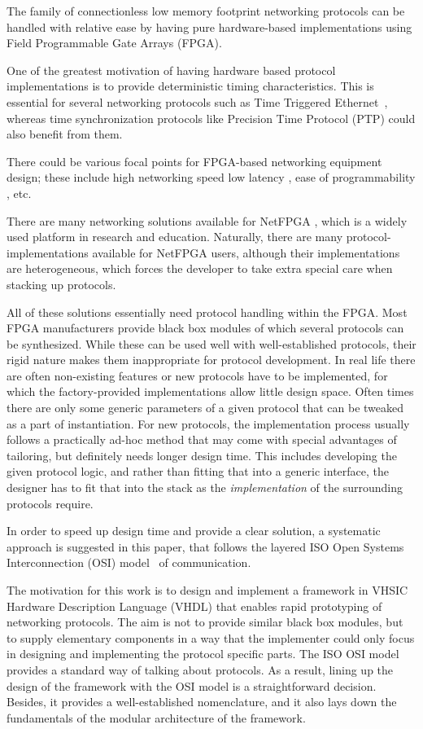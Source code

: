 \documentclass[journal]{IEEEtran}
\begin{document}
The family of connectionless low memory footprint networking protocols can be handled with relative ease by having pure
hardware-based implementations using Field Programmable Gate Arrays (FPGA).

One of the greatest motivation of having hardware based protocol implementations is to provide deterministic timing
characteristics. This is essential for several networking protocols such as Time Triggered Ethernet~\cite{SAE_AS6802},
whereas time synchronization protocols like  Precision Time Protocol (PTP) \cite{PTP_standard}could also benefit from
them.

There could be various focal points for FPGA-based networking equipment design; these include high networking speed
\cite{C-GEP_HPSR} low latency \cite{related:TrustNode}, ease of programmability \cite{C-Board_NEMA}, etc.

There are many networking solutions available for NetFPGA \cite{NetFPGA}, which is a widely used platform
in research and education. Naturally, there are many protocol-implementations available for NetFPGA users, although
their implementations are heterogeneous, which forces the developer to take extra special care when stacking up
protocols.

All of these solutions essentially need protocol handling within the FPGA. Most FPGA manufacturers provide black box
modules of which several protocols can be synthesized. While these can be used well with well-established protocols,
their rigid nature makes them inappropriate for protocol development.
In real life there are often non-existing features
or new protocols have to be implemented, for which the factory-provided implementations allow little design space.
Often times there are only some generic parameters of a given protocol that can be tweaked as a part of instantiation.
For new protocols, the implementation process usually follows a practically ad-hoc method that may come with special
advantages of tailoring, but definitely needs longer design time.
This includes developing the given protocol logic, and rather than fitting that into a generic interface,
the designer has to fit that into the stack as the \emph{implementation} of the surrounding protocols require.

In order to speed up design time and provide a clear solution, a systematic approach is suggested in this paper,
that follows the layered ISO Open Systems Interconnection (OSI) model~\cite{ISO:OSI} of communication.

The motivation for this work is to design and implement a framework in VHSIC Hardware Description Language (VHDL) that enables rapid prototyping of
networking protocols. The aim is not to provide similar black box modules, but to supply elementary components in a way
that the implementer could only focus in designing and implementing the protocol specific parts. The ISO OSI model
provides a standard way of talking about protocols. As a result, lining up the design of the framework with the OSI
model is a straightforward decision. Besides, it provides a well-established nomenclature, and it also lays down the
fundamentals of the modular architecture of the framework.
\end{document}
